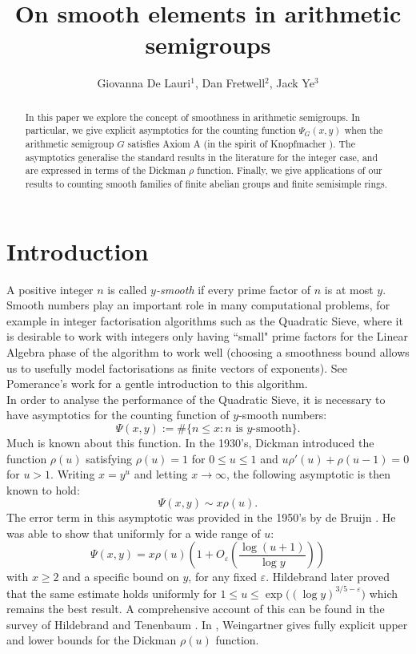 \documentclass[a4paper]{amsart}
\title{On smooth elements in arithmetic semigroups}
\author{Giovanna De Lauri$^1$, Dan Fretwell$^2$, Jack Ye$^3$}
\date{}
\begin{document}
\begin{abstract}
 In this paper we explore the concept of smoothness in arithmetic semigroups. In particular, we give explicit asymptotics for the counting function $\Psi_G(x,y)$ when the arithmetic semigroup $G$ satisfies Axiom A (in the spirit of Knopfmacher \cite{knopfmacher2015abstract}). The asymptotics generalise the standard results in the literature for the integer case, and are expressed in terms of the Dickman $\rho$ function. Finally, we give applications of our results to counting smooth families of finite abelian groups and finite semisimple rings.
\end{abstract}

\maketitle

\section{Introduction}

A positive integer
$n$ is called \emph{$y$-smooth} if every prime
factor of $n$ is at most $y$. Smooth numbers play an important role in many computational problems, for example in integer factorisation algorithms such as the Quadratic Sieve, where it is desirable to work with integers only having ``small" prime factors for  the Linear Algebra phase of the algorithm to work well (choosing a smoothness bound allows us to usefully model factorisations as finite vectors of exponents). See Pomerance's work \cite{pomerance1996tale, pomerance2008smooth} for a gentle introduction to this algorithm. \\

In order to analyse the performance of the Quadratic Sieve, it is necessary to have asymptotics for the counting function of $y$-smooth numbers:
$$
  \Psi(x,y) := \#\{n\le x : n \text{ is } y\text{-smooth}\}.
$$
Much is known about this function. In the 1930's, Dickman \cite{dickman1930frequency} introduced the function $\rho(u)$ satisfying $\rho(u)=1$ for $0\le u\le1$ and $u\rho'(u)+\rho(u-1)=0$ for $u>1$. Writing $x = y^u$ and letting $x \to \infty$, the following asymptotic is then known to hold: 
$$\Psi(x,y) \sim x \rho(u). $$
The error term in this asymptotic was provided in the 1950's by de Bruijn \cite{de1951number}. He was able to show that uniformly for a wide range of $u$: 
$$
\Psi(x,y) = x\rho(u)\left(1+O_\varepsilon\left(\frac{\log(u+1)}{\log y}\right)\right)
$$
with $x \geq 2$ and a specific bound on $y$, for any fixed $\varepsilon$. Hildebrand
\cite{hildebrand1986number} later proved that the same estimate holds uniformly for $
  1 \le u \le \exp\big((\log y)^{3/5-\varepsilon}\big)$ which remains the best result. A comprehensive account of this can be found in the survey of Hildebrand
and Tenenbaum \cite{hildebrand1993integers}. In \cite{weingartner2026explicit}, Weingartner gives fully explicit upper and lower bounds for the Dickman $\rho(u)$ function. \\
\end{document}
